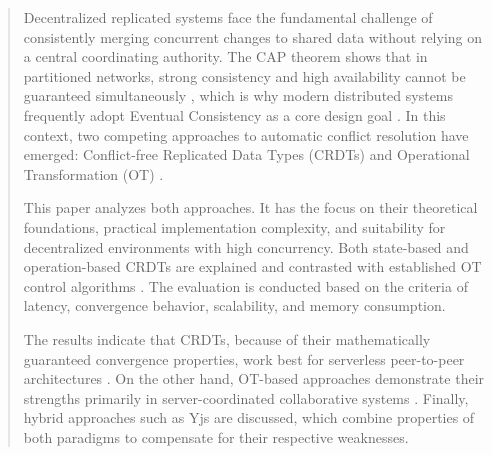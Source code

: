 \begin{abstract}
Decentralized replicated systems face the fundamental challenge of consistently
merging concurrent changes to shared data without relying on a central
coordinating authority. The CAP theorem \cite{brewer2000} shows that in
partitioned networks, strong consistency and high availability cannot be
guaranteed simultaneously \cite{gilbert2002}, which is why modern distributed
systems frequently adopt Eventual Consistency as a core design goal
\cite{shapiro2011comprehensive}. In this context, two competing approaches to
automatic conflict resolution have emerged: Conflict-free Replicated Data Types
(CRDTs) \cite{shapiro2011comprehensive} and Operational Transformation (OT)
\cite{ellis1989}.

This paper analyzes both approaches. It has the focus on their theoretical
foundations, practical implementation complexity, and suitability for
decentralized environments with high concurrency. Both state-based and
operation-based CRDTs are explained and contrasted with established OT control
algorithms \cite{shapiro2011crdt}. The evaluation is conducted based on the
criteria of latency, convergence behavior, scalability, and memory consumption.

The results indicate that CRDTs, because of their mathematically guaranteed
convergence properties, work best for serverless peer-to-peer architectures
\cite{kleppmann2019}. On the other hand, OT-based approaches demonstrate their
strengths primarily in server-coordinated collaborative systems
\cite{ellis1989}. Finally, hybrid approaches such as Yjs \cite{nicolaescu2015}
are discussed, which combine properties of both paradigms to compensate for
their respective weaknesses.
\end{abstract}